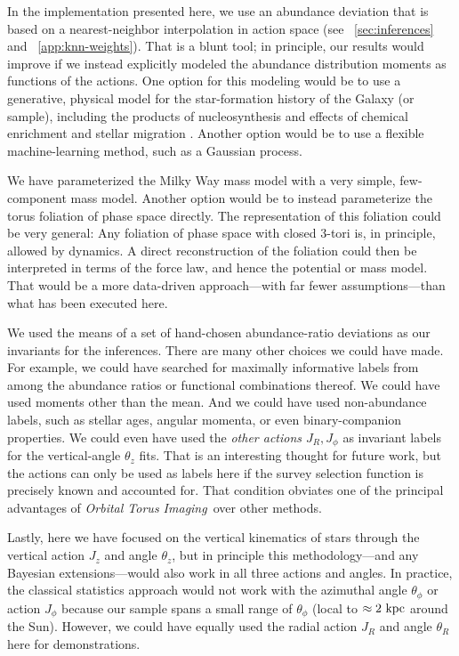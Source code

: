\documentclass[modern]{aastex63}
\newcommand{\methodname}{\textsl{Orbital Torus Imaging}}
\begin{document}
In the implementation presented here, we use an abundance deviation that is
based on a nearest-neighbor interpolation in action space (see
\sectionname~\ref{sec:inferences} and \appendixname~\ref{app:knn-weights}).
That is a blunt tool; in principle, our results would improve if we instead
explicitly modeled the abundance distribution moments as functions of the
actions.
One option for this modeling would be to use a generative, physical model for
the star-formation history of the Galaxy (or sample), including the products of
nucleosynthesis and effects of chemical enrichment and stellar migration
\citep[similar to what is done in][]{Sanders:2015}.
Another option would be to use a flexible machine-learning method, such as a
Gaussian process.

We have parameterized the Milky Way mass model with
a very simple, few-component mass model.
Another option would be to instead parameterize the torus foliation of phase
space directly.
The representation of this foliation could be very general: Any foliation of
phase space with closed 3-tori is, in principle, allowed by dynamics.
A direct reconstruction of the foliation could then be interpreted in terms of
the force law, and hence the potential or mass model.
That would be a more data-driven approach---with far fewer assumptions---than
what has been executed here.

We used the means of
a set of hand-chosen abundance-ratio deviations
as our invariants for the inferences.
There are many other choices we could have made.
For example, we could have searched for maximally informative labels from among
the abundance ratios or functional combinations thereof. We could have used
moments other than the mean. And we could have used non-abundance labels, such
as stellar ages, angular momenta, or even binary-companion properties.
We could even have used the \emph{other actions $J_R, J_\phi$}
as invariant labels for the vertical-angle $\theta_z$ fits.
That is an interesting thought for future work, but the actions can only be used
as labels here if the survey selection function is precisely known and accounted
for. That condition obviates one of the principal advantages of
\methodname\ over other methods.

Lastly, here we have focused on the vertical kinematics of stars through the
vertical action $J_z$ and angle $\theta_z$, but in principle this
methodology---and any Bayesian extensions---would also work in all three actions
and angles.
In practice, the classical statistics approach would not work with the azimuthal
angle $\theta_\phi$ or action $J_\phi$ because our sample spans a small range of
$\theta_\phi$ (local to $\approx 2~\mathrm{kpc}$ around the Sun).
However, we could have equally used the radial action $J_R$ and angle $\theta_R$
here for demonstrations.
\end{document}

